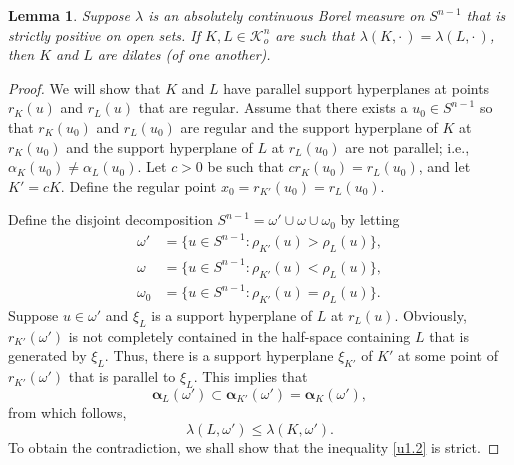 \documentclass{cpamart1}     %
\newtheorem{lemm}[theo]{Lemma}
\theoremstyle{definition}
\theoremstyle{remark}
\newcommand{\sn}{S^{n-1}}
\newcommand{\kno}{\mathcal K^n_o}
\newcommand{\balpha}{\pmb{\alpha}}
\begin{document}
\begin{lemm}\label{u1}
Suppose $\lambda$ is an absolutely continuous Borel
measure on $\sn$ that is strictly positive on open sets. If $K, L \in \kno$ are such that
$\lambda(K,\cdot\,) = \lambda(L,\cdot\,)$, then $K$ and $L$ are dilates (of one another).
\end{lemm}

\begin{proof}
We will show that $K$ and $L$ have parallel support hyperplanes
at points $r_K(u)$ and $r_L(u)$ that are regular. Assume that there exists a
$u_0\in \sn$ so that  $r_K(u_0)$ and $r_L(u_0)$ are regular and the support
hyperplane of $K$ at $r_K(u_0)$ and the support hyperplane of $L$ at $r_L(u_0)$
are not parallel; i.e., $\alpha_{K}(u_0) \neq \alpha_L(u_0)$. Let $c >0$ be
such that $c r_K(u_0) = r_L(u_0)$,
and let $K' = c K$. Define the regular point $x_0=r_{K'}(u_0) = r_L(u_0)$.

Define the disjoint decomposition $\sn=\omega'\cup \omega \cup \omega_0$ by letting
\begin{align*}
\omega' &=\{u\in\sn : \rho_{K'}(u) > \rho_{L}(u)\}, \\
\omega&=\{u\in\sn : \rho_{K'}(u) < \rho_{L}(u)\}, \\
\omega_0&=\{u\in\sn : \rho_{K'}(u) = \rho_{L}(u)\}.
\end{align*}
Suppose $u\in \omega'$ and $\xi_L$ is a support hyperplane of $L$ at $r_{L}(u)$.
Obviously, $r_{K'}(\omega')$ is not completely contained in the half-space containing $L$ that is generated by $\xi_L$. Thus,
there is a support hyperplane $\xi_{K'}$ of $K'$ at some point
of $r_{K'}(\omega')$ that is parallel to $\xi_L$. This implies that
\begin{equation}\label{u1.1}
\balpha_{L}(\omega') \subset \balpha_{K'}(\omega') = \balpha_{K}(\omega'),
\end{equation}
from which follows,
\begin{equation}\label{u1.2}
\lambda(L,\omega') \le \lambda(K,\omega').
\end{equation}
To obtain the contradiction, we shall show that the inequality \eqref{u1.2} is strict.


\end{proof}
\end{document}
